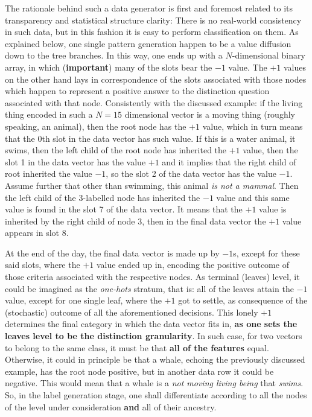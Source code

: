 \documentclass[a4paper,12pt]{article}
\begin{document}
The rationale behind such a data generator is first and foremost related to its transparency and statistical structure clarity: There is no real-world consistency in such data, but in this fashion it is easy to perform classification on them. As explained below, one single pattern generation happen to be a value diffusion down to the tree branches. In this  way, one ends up with a $N$-dimensional binary array, in which (\textbf{important}) many of the slots bear the $-1$ value. The $+1$ values on the other hand lays in correspondence of the slots associated with those nodes which happen to represent a positive answer to the distinction question associated with that node. Consistently with the discussed example: if the living thing encoded in such a $N = 15$ dimensional vector is a moving thing (roughly speaking, an animal), then the root node has the $+1$ value, which in turn means that the 0th slot in the data vector has such value. If this is a water animal, it swims, then the left child of the root node has inherited the $+1$ value, then the slot 1 in the data vector has the value $+1$ and it implies that the right child of root inherited the value $-1$, so the slot 2 of the data vector has the value $-1$. Assume further that other than swimming, this animal \textit{is not a mammal}. Then the left child of the 3-labelled node has inherited the $-1$ value and this same value is found in the slot 7 of the data vector. It means that the $+1$ value is inherited by the right child of node 3, then in the final data vector the $+1$ value appears in slot 8. 

At the end of the day, the final data vector is made up by $-1$s, except for these said slots, where the $+1$ value ended up in, encoding the positive outcome of those criteria associated with the respective nodes. As terminal (leaves) level, it could be imagined as the \textit{one-hots} stratum, that is: all of the leaves attain the $-1$ value, except for one single leaf, where the $+1$ got to settle, as consequence of the (stochastic) outcome of all the aforementioned decisions. This lonely $+1$ determines the final category in which the data vector fits in, \textbf{as one sets the leaves level to be the distinction granularity}. In such case, for two vectors to belong to the same class, it must be that \textbf{all of the features} equal. Otherwise, it could in principle be that a whale, echoing the previously discussed example, has the root node positive, but in another data row it could be negative. This would mean that a whale is a \textit{not moving living being} that \textit{swims}. So, in the label generation stage, one shall differentiate according to all the nodes of the level under consideration \textbf{and} all of their ancestry.
\end{document}
